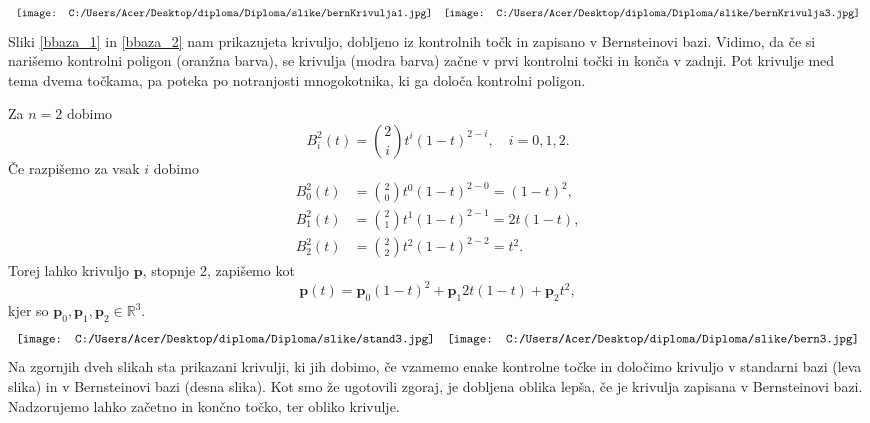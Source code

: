 \documentclass[mat1]{fmfdelo}
\newcommand{\R}{\mathbb R}
\newcommand{\pp}{\boldsymbol p}
\begin{document}
\begin{equation*}
\begin{array}{c c}
\texttt{[image: C:/Users/Acer/Desktop/diploma/Diploma/slike/bernKrivulja1.jpg]} &
\texttt{[image: C:/Users/Acer/Desktop/diploma/Diploma/slike/bernKrivulja3.jpg]}
\end{array}
\end{equation*}
Sliki \ref{bbaza_1} in \ref{bbaza_2} nam prikazujeta krivuljo, dobljeno iz kontrolnih točk in zapisano v Bernsteinovi bazi. Vidimo, da če si narišemo kontrolni poligon (oranžna barva), se krivulja (modra barva) začne v prvi kontrolni točki in konča v zadnji. Pot krivulje med tema dvema točkama, pa poteka po notranjosti mnogokotnika, ki ga določa kontrolni poligon.
\iffalse
Primer prileganja krivulje kontrolnemu poligoni na točkah (0,0), (1,1), (2,-1), (0,-3), (-2,2) in če dodamo še (3,2).
\fi
\begin{primer}Za $n = 2$ dobimo
\begin{equation*}
B_i^2(t) = \binom{2}{i} t^i(1-t)^{2-i}, \quad i=0,1,2.
\end{equation*}
Če razpišemo za vsak $i$ dobimo
\begin{equation*}
\begin{split}
B_0^2(t) &= \binom{2}{0} t^0(1-t)^{2-0} = (1-t)^2,\\
B_1^2(t) &= \binom{2}{1} t^1(1-t)^{2-1} = 2t(1-t),\\
B_2^2(t) &= \binom{2}{2} t^2(1-t)^{2-2} = t^2.
\end{split}
\end{equation*}
Torej lahko krivuljo $\pp$, stopnje 2, zapišemo kot
\begin{equation*}
	\pp(t) = \pp_0(1-t)^2 + \pp_1 2t(1-t) + \pp_2t^2,
\end{equation*}
kjer so $\pp_0, \pp_1, \pp_2 \in \R^3$. 
\begin{equation*}
\begin{array}{c c}
\texttt{[image: C:/Users/Acer/Desktop/diploma/Diploma/slike/stand3.jpg]} &
\texttt{[image: C:/Users/Acer/Desktop/diploma/Diploma/slike/bern3.jpg]}
\end{array}
\end{equation*}
Na zgornjih dveh slikah sta prikazani krivulji, ki jih dobimo, če vzamemo enake kontrolne točke in določimo krivuljo v standarni bazi (leva slika) in v Bernsteinovi bazi (desna slika). Kot smo že ugotovili zgoraj, je dobljena oblika lepša, če je krivulja zapisana v Bernsteinovi bazi. Nadzorujemo lahko začetno in končno točko, ter obliko krivulje.
\end{primer}
\end{document}
